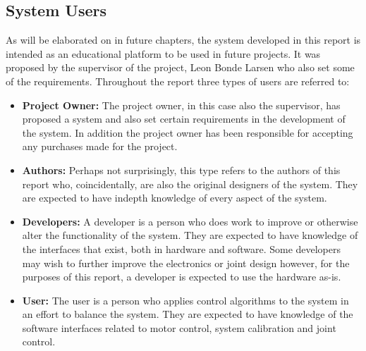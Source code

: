 \subsection{System Users} %
\label{sub:system_users}
As will be elaborated on in future chapters, the system developed in this report is intended as an educational platform to be used in future projects.
It was proposed by the supervisor of the project, Leon Bonde Larsen who also set some of the requirements.
Throughout the report three types of users are referred to:
\begin{itemize}
	\item \textbf{Project Owner:} The project owner, in this case also the supervisor, has proposed a system and also set certain requirements in the development of the system.
	In addition the project owner has been responsible for accepting any purchases made for the project. 
	\item \textbf{Authors:} Perhaps not surprisingly, this type refers to the authors of this report who, coincidentally, are also the original designers of the system.
	They are expected to have indepth knowledge of every aspect of the system.
	\item \textbf{Developers:} A developer is a person who does work to improve or otherwise alter the functionality of the system.
	They are expected to have knowledge of the interfaces that exist, both in hardware and software.
	Some developers may wish to further improve the electronics or joint design however, for the purposes of this report, a developer is expected to use the hardware as-is.
	\item \textbf{User:} The user is a person who applies control algorithms to the system in an effort to balance the system.
	They are expected to have knowledge of the software interfaces related to motor control, system calibration and joint control.
\end{itemize}

